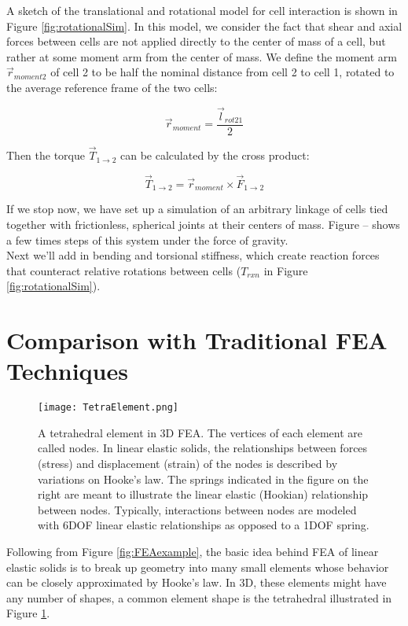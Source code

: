 {A sketch of the translational and rotational model for cell interaction is shown in Figure \ref{fig:rotationalSim}.  In this model, we consider the fact that shear and axial forces between cells are not applied directly to the center of mass of a cell, but rather at some moment arm from the center of mass.  We define the moment arm $\vec{r}_{moment2}$ of cell 2 to be half the nominal distance from cell 2 to cell 1, rotated to the average reference frame of the two cells:

\[ \vec{r}_{moment} = \dfrac{\vec{l}_{rot21}}{2}\]

Then the torque $\vec{T}_{1\rightarrow2}$ can be calculated by the cross product:

\[ \vec{T}_{1\rightarrow2} =  \vec{r}_{moment} \times \vec{F}_{1\rightarrow2}\]

If we stop now, we have set up a simulation of an arbitrary linkage of cells tied together with frictionless, spherical joints at their centers of mass.  Figure -- shows a few times steps of this system under the force of gravity.\\

Next we'll add in bending and torsional stiffness, which create reaction forces that counteract relative rotations between cells ($T_{rxn}$ in Figure \ref{fig:rotationalSim}).  \\

\section{Comparison with Traditional FEA Techniques}

\begin{figure}
  \texttt{[image: TetraElement.png]}
  \caption{A tetrahedral element in 3D FEA.  The vertices of each element are called nodes.  In linear elastic solids, the relationships between forces (stress) and displacement (strain) of the nodes is described by variations on Hooke's law.  The springs indicated in the figure on the right are meant to illustrate the linear elastic (Hookian) relationship between nodes.  Typically, interactions between nodes are modeled with 6DOF linear elastic relationships as opposed to a 1DOF spring.}
  \label{fig:TetraElement}
\end{figure}

Following from Figure \ref{fig:FEAexample}, the basic idea behind FEA of linear elastic solids is to break up geometry into many small elements whose behavior can be closely approximated by Hooke's law.  In 3D, these elements might have any number of shapes, a common element shape is the tetrahedral illustrated in Figure \ref{fig:TetraElement}.

}
